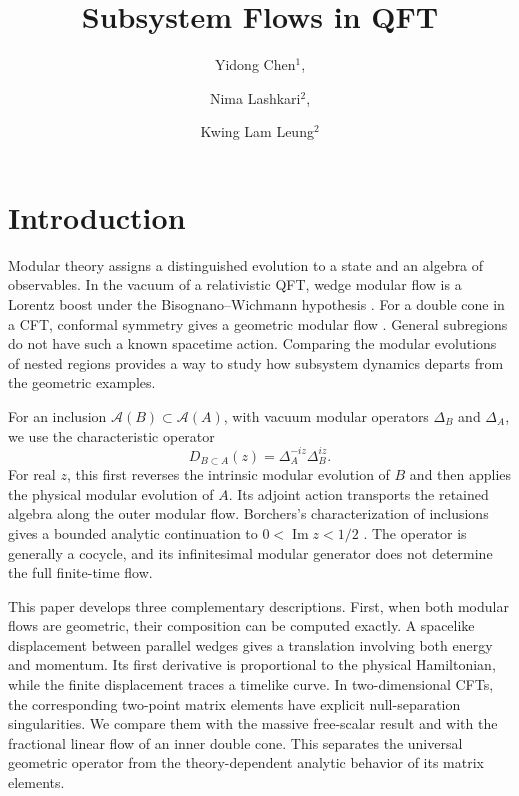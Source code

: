 \documentclass[a4paper,11pt]{article}
\title{Subsystem Flows in QFT}
\author{Yidong Chen$^1$,}
\author{Nima Lashkari$^2$,}
\author{Kwing Lam Leung$^2$}
\affiliation{$^1$Department of Mathematics, University of Illinois at Urbana-Champaign, Illinois, IL 61801, USA}
\affiliation{$^2$Department of Physics and Astronomy, Purdue University, West Lafayette, IN 47907, USA}
\theoremstyle{definition}
\begin{document}
\maketitle

\section{Introduction}

Modular theory assigns a distinguished evolution to a state and an algebra of
observables. In the vacuum of a relativistic QFT, wedge modular flow is a Lorentz
boost under the Bisognano--Wichmann hypothesis \cite{bisognanowichmann}. For a
double cone in a CFT, conformal symmetry gives a geometric modular flow
\cite{BrunettiGuidoLongo1993}. General subregions do not have such a known
spacetime action. Comparing the modular evolutions of nested regions provides a
way to study how subsystem dynamics departs from the geometric examples.

For an inclusion $\mathcal A(B)\subset\mathcal A(A)$, with vacuum modular
operators $\Delta_B$ and $\Delta_A$, we use the characteristic operator
\begin{equation}
 D_{B\subset A}(z)=\Delta_A^{-iz}\Delta_B^{iz}.
 \label{eq:intro-characteristic}
\end{equation}
For real $z$, this first reverses the intrinsic modular evolution of $B$ and
then applies the physical modular evolution of $A$. Its adjoint action transports
the retained algebra along the outer modular flow. Borchers's characterization
of inclusions gives a bounded analytic continuation to
$0<\operatorname{Im}z<1/2$ \cite{revolutionizing}. The operator is generally a
cocycle, and its infinitesimal modular generator does not determine the full
finite-time flow.

This paper develops three complementary descriptions. First, when both modular
flows are geometric, their composition can be computed exactly. A spacelike
displacement between parallel wedges gives a translation involving both energy
and momentum. Its first derivative is proportional to the physical Hamiltonian,
while the finite displacement traces a timelike curve. In two-dimensional CFTs,
the corresponding two-point matrix elements have explicit null-separation
singularities. We compare them with the massive free-scalar result and with the
fractional linear flow of an inner double cone. This separates the universal
geometric operator from the theory-dependent analytic behavior of its matrix
elements.
\end{document}
